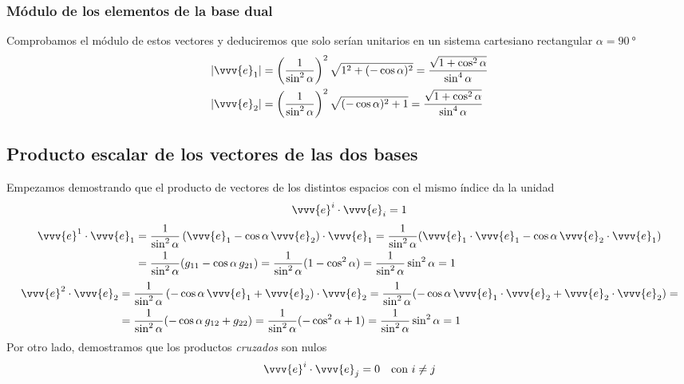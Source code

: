 \subsubsection{Módulo de los elementos de la base dual}
Comprobamos el módulo de estos vectores y deduciremos que solo serían unitarios en un
sistema cartesiano rectangular $\alpha=\qty{90}{\degree}$
\begin{align}
  \left|\vvv{e}_1\right|
  &= \left(\dfrac{1}{\sin^2\alpha}\right)^2
    \sqrt{1^2 + (-\cos\alpha)^2}
    = \dfrac{\sqrt{1+\cos^2\alpha}}{\sin^4\alpha}\\
  \left|\vvv{e}_2\right|
  &= \left(\dfrac{1}{\sin^2\alpha}\right)^2
    \sqrt{(-\cos\alpha)^2 + 1}
    = \dfrac{\sqrt{1+\cos^2\alpha}}{\sin^4\alpha}
\end{align}

\subsection{Producto escalar de los vectores de las dos bases}
Empezamos demostrando que el producto de vectores de los distintos espacios con el mismo
índice da la unidad
\begin{equation}
  \vvv{e}^i \cdot \vvv{e}_i = 1
\end{equation}
\begin{align*}
  \vvv{e}^1\cdot\vvv{e}_1
  &=
    \dfrac{1}{\sin^2\alpha}
    \left(\vvv{e}_1-\cos\alpha\,\vvv{e}_2\right)\cdot\vvv{e}_1
    = \dfrac{1}{\sin^2\alpha}
    (\vvv{e}_1\cdot\vvv{e}_1 - \cos\alpha\,\vvv{e}_2\cdot\vvv{e}_1)\\
  &=
    \dfrac{1}{\sin^2\alpha}
    (g_{11}-\cos\alpha\,g_{21})
    = \dfrac{1}{\sin^2\alpha}(1-\cos^2\alpha)
    = \dfrac{1}{\sin^2\alpha}\sin^2\alpha
    = 1
\end{align*}
\begin{align*}
  \vvv{e}^2\cdot\vvv{e}_2
  &=
    \dfrac{1}{\sin^2\alpha}
    \left(-\cos\alpha\,\vvv{e}_1+\vvv{e}_2\right)\cdot\vvv{e}_2
    = \dfrac{1}{\sin^2\alpha}
    (-\cos\alpha\,\vvv{e}_1\cdot\vvv{e}_2+\vvv{e}_2\cdot\vvv{e}_2)
  = \\
  &= \dfrac{1}{\sin^2\alpha}
    (-\cos\alpha\,g_{12} + g_{22})
    = \dfrac{1}{\sin^2\alpha}(-\cos^2\alpha+1)
    = \dfrac{1}{\sin^2\alpha}\sin^2\alpha
    = 1
\end{align*}
Por otro lado, demostramos que los productos \emph{cruzados} son nulos
\begin{equation}
  \vvv{e}^i\cdot\vvv{e}_j = 0
  \hspace{1em}\text{con } i\neq j
\end{equation}
